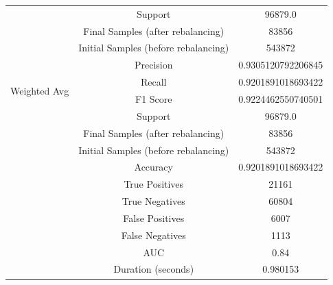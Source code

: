 \begin{longtable}{|c|c|c|}
 & Support & 96879.0 \\
 & Final Samples (after rebalancing) & 83856 \\
 & Initial Samples (before rebalancing) & 543872 \\
\hline
\multirow{4}{*}{Weighted Avg} & Precision & 0.9305120792206845 \\
 & Recall & 0.9201891018693422 \\
 & F1 Score & 0.9224462550740501 \\
 & Support & 96879.0 \\
 & Final Samples (after rebalancing) & 83856 \\
 & Initial Samples (before rebalancing) & 543872 \\
\hline
& Accuracy & 0.9201891018693422 \\ \hline
& True Positives & 21161 \\ \hline
& True Negatives & 60804 \\ \hline
& False Positives & 6007 \\ \hline
& False Negatives & 1113 \\ \hline
& AUC & 0.84 \\ \hline
& Duration (seconds) & 0.980153 \\ \hline
\end{longtable}


